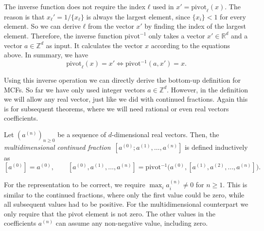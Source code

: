 The inverse function does not require the index $ℓ$ used in $x' = \mathrm{pivot}_ℓ(x)$.
The reason is that $x_ℓ' = 1/\{x_ℓ\}$ is always the largest element, since $\{x_i\} < 1$ for every element.
So we can derive $ℓ$ from the vector $x'$ by finding the index of the largest element.
Therefore, the inverse function $\mathrm{pivot}^{-1}$ only takes
a vector $x' ∈ ℝ^d$ and a vector $a ∈ ℤ^d$ as input.
It calculates the vector $x$ according to the equations above.
In summary, we have
\[
  \mathrm{pivot}_ℓ(x) = x' \iff \mathrm{pivot}^{-1}(a, x') = x.
\]

Using this inverse operation we can directly derive the bottom-up definition for MCFs.
So far we have only used integer vectors $a ∈ ℤ^d$.
However, in the definition we will allow any real vector,
just like we did with continued fractions.
Again this is for subsequent theorems, where we will need rational or even real vectors coefficients.

\begin{definition}
  Let $(a^{(n)})_{n ≥ 0}$ be a sequence of $d$-dimensional real vectors.
  Then, the \emph{multidimensional continued fraction}~$[a^{(0)}; a^{(1)}, …, a^{(n)}]$ is defined inductively as
  \[
    [a^{(0)}] = a^{(0)},
    \qquad
    [a^{(0)}, a^{(1)}, …, a^{(n)}]
    = \mathrm{pivot}^{-1}\big(a^{(0)}, [a^{(1)}, a^{(2)}, …, a^{(n)}]\big).
  \]
\end{definition}

For the representation to be correct, we require $\max_i a_i^{(n)} ≠ 0$ for $n ≥ 1$.
This is similar to the continued fractions, where only the first value could be zero,
while all subsequent values had to be positive.
For the multidimensional counterpart we only require that the pivot element is not zero.
The other values in the coefficients $a^{(n)}$ can assume any non-negative value, including zero.

